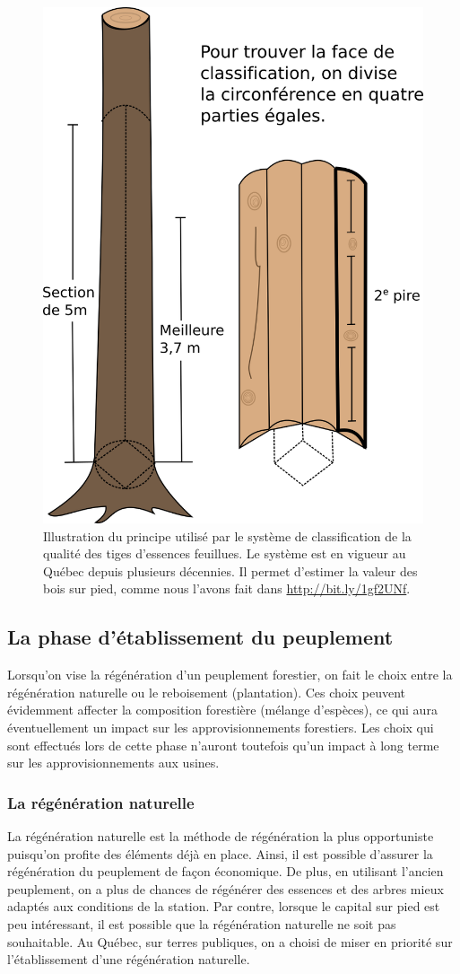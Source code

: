 \begin{figure}[ht]
	\centering
	\includegraphics[width=0.5\linewidth]{img/ch8_Monger}
	\caption{Illustration du principe utilisé par le système de classification de la qualité des tiges d'essences feuillues. Le système est en vigueur au Québec depuis plusieurs décennies. Il permet d'estimer la valeur des bois sur pied, comme nous l'avons fait dans \cite{hassegawa2015large} \url{http://bit.ly/1gf2UNf}.}
	\label{fig:Monger}
\end{figure}

\subsection{La phase d'établissement du peuplement}

Lorsqu'on vise la régénération d'un peuplement forestier, on fait le choix entre la régénération naturelle ou le reboisement (plantation). Ces choix peuvent évidemment affecter la composition forestière (mélange d'espèces), ce qui aura éventuellement un impact sur les approvisionnements forestiers. Les choix qui sont effectués lors de cette phase n'auront toutefois qu'un impact à long terme sur les approvisionnements aux usines.

\subsubsection{La régénération naturelle}

La régénération naturelle est la méthode de régénération la plus opportuniste puisqu'on profite des éléments déjà en place. Ainsi, il est possible d'assurer la régénération du peuplement de façon économique. De plus, en utilisant l'ancien peuplement, on a plus de chances de régénérer des essences et des arbres mieux adaptés aux conditions de la station. Par contre, lorsque le capital sur pied est peu intéressant, il est possible que la régénération naturelle ne soit pas souhaitable. Au Québec, sur terres publiques, on a choisi de miser en priorité sur l'établissement d'une régénération naturelle.\\

